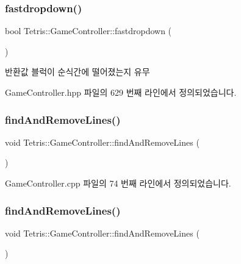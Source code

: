 \subsubsection{\texorpdfstring{fastdropdown()}{fastdropdown()}\hspace{0.1cm}{\footnotesize\ttfamily [2/2]}}
{\footnotesize\ttfamily bool Tetris\+::\+Game\+Controller\+::fastdropdown (\begin{DoxyParamCaption}{ }\end{DoxyParamCaption})\hspace{0.3cm}{\ttfamily [inline]}}

\begin{DoxyReturn}{반환값}
블럭이 순식간에 떨어졌는지 유무 
\end{DoxyReturn}


Game\+Controller.\+hpp 파일의 629 번째 라인에서 정의되었습니다.

\mbox{\label{class_tetris_1_1_game_controller_ab19e8563acc9e724e130de60f87600b7}} 
\subsubsection{\texorpdfstring{find\+And\+Remove\+Lines()}{findAndRemoveLines()}\hspace{0.1cm}{\footnotesize\ttfamily [1/2]}}
{\footnotesize\ttfamily void Tetris\+::\+Game\+Controller\+::find\+And\+Remove\+Lines (\begin{DoxyParamCaption}{ }\end{DoxyParamCaption})}



Game\+Controller.\+cpp 파일의 74 번째 라인에서 정의되었습니다.

\mbox{\label{class_tetris_1_1_game_controller_ab19e8563acc9e724e130de60f87600b7}} 
\subsubsection{\texorpdfstring{find\+And\+Remove\+Lines()}{findAndRemoveLines()}\hspace{0.1cm}{\footnotesize\ttfamily [2/2]}}
{\footnotesize\ttfamily void Tetris\+::\+Game\+Controller\+::find\+And\+Remove\+Lines (\begin{DoxyParamCaption}{ }\end{DoxyParamCaption})\hspace{0.3cm}{\ttfamily [inline]}}



